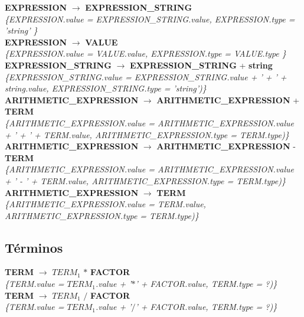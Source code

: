 \documentclass[10pt,a4paper]{article}
\begin{document}
\textbf{EXPRESSION} $\rightarrow$ \textbf{EXPRESSION\_STRING} \\
\textit{\{EXPRESSION.value =  EXPRESSION\_STRING.value, EXPRESSION.type = 'string' \}}  \\ 

\textbf{EXPRESSION} $\rightarrow$ \textbf{VALUE} \\
\textit{\{EXPRESSION.value =  VALUE.value, EXPRESSION.type = VALUE.type \}} \\

\textbf{EXPRESSION\_STRING} $\rightarrow$ \textbf{EXPRESSION\_STRING} + \textbf{string} \\ \textit{\{EXPRESSION\_STRING.value =  EXPRESSION\_STRING.value + ' + ' + string.value, EXPRESSION\_STRING.type = 'string')\}} \\

\textbf{ARITHMETIC\_EXPRESSION} $\rightarrow$ \textbf{ARITHMETIC\_EXPRESSION} + \textbf{TERM} \\
\textit{\{ARITHMETIC\_EXPRESSION.value =  ARITHMETIC\_EXPRESSION.value + ' + ' + TERM.value, ARITHMETIC\_EXPRESSION.type = TERM.type)\}} \\

\textbf{ARITHMETIC\_EXPRESSION} $\rightarrow$ \textbf{ARITHMETIC\_EXPRESSION} - \textbf{TERM}  \\
\textit{\{ARITHMETIC\_EXPRESSION.value =  ARITHMETIC\_EXPRESSION.value + ' - ' + TERM.value, ARITHMETIC\_EXPRESSION.type = TERM.type)\}} \\

\textbf{ARITHMETIC\_EXPRESSION} $\rightarrow$ \textbf{TERM} \\
\textit{\{ARITHMETIC\_EXPRESSION.value = TERM.value, ARITHMETIC\_EXPRESSION.type = TERM.type)\}}  \\

\subsection{Términos}
\textbf{TERM} $\rightarrow$ \textbf{$TERM_{1}$} $*$ \textbf{FACTOR}   \\
\textit{\{TERM.value = $TERM_{1}$.value + '$*$' + FACTOR.value, TERM.type = ?)\}} \\

\textbf{TERM} $\rightarrow$ \textbf{$TERM_{1}$} $/$ \textbf{FACTOR}   \\
\textit{\{TERM.value = $TERM_{1}$.value + '$/$' + FACTOR.value, TERM.type = ?)\}} \\
\end{document}
